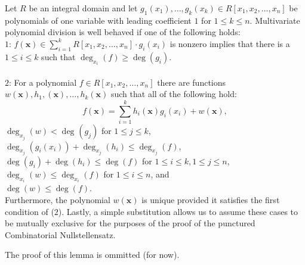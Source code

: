 \begin{lemma} Let $R$ be an integral domain
	and let $g_{1} \left( x_{1} \right), \ldots, g_{k} \left( x_{k} \right)
	\in R[x_1, x_2, \ldots, x_{n}] $ be polynomials of one variable with
	leading coefficient $1$ for $1 \le k \le n$. Multivariate polynomial
	division is well behaved if one of the following holds:\\ $1$: $f
	\left(  \textbf{x} \right) \in \sum_{i= 1}^{k}  R[x_1, x_2, \ldots,
	x_{n}] \cdot g_{i} \left( x_{i} \right)$ is nonzero implies that there
	is a $1 \le i \le k$ such that $\deg _{x_{i}} \left(  f \right) \ge
	\deg \left( g_{i} \right)$.\\ \\ $2$: For a polynomial $f \in R [x_1,
	x_2, \ldots, x_{n}]$ there are functions \\$w \left( \textbf{x} \right)
	, h_1, \left( \textbf{x} \right), \ldots, h_k \left( \textbf{x} \right)
	$ such that all of the following hold:\\ \begin{equation} f\left(
	\textbf{x} \right) = \sum_{i= 1}^{k} h_{i} \left( \textbf{x} \right)
g_{i} \left( x_{i} \right)  + w\left( \textbf{x} \right) ,\end{equation} $\deg
_{ x_j} \left( w \right) < \deg _{} \left( g_{j} \right) $ for $ 1\le j \le k$,
\\$\deg _{ x_j} \left( g_{i} \left( x_{i} \right) \right) + \deg _{ x_j} \left(
h_{i} \right) \le \deg _{ x_j} \left( f \right)$, $\deg \left( g_{i} \right) +
\deg \left( h_{i} \right) \le \deg \left(  f \right)$ for $1 \le i \le k, 1 \le
j\le n$, \\ $\deg _{x_{i}} \left( w \right) \le \deg _{ x_{i}} \left(  f
\right) $ for $1 \le i \le n$, and \\ $\deg \left( w \right)\le \deg \left( f
\right)$.\\ Furthermore, the polynomial $w\left( \textbf{x} \right) $ is unique
provided it satisfies the first condition of ($2$). Lastly, a simple
substitution allows us to assume these cases to be mutually exclusive for the
purposes of the proof of the punctured Combinatorial Nullstellensatz.
\end{lemma} The proof of this lemma is ommitted (for now). 
